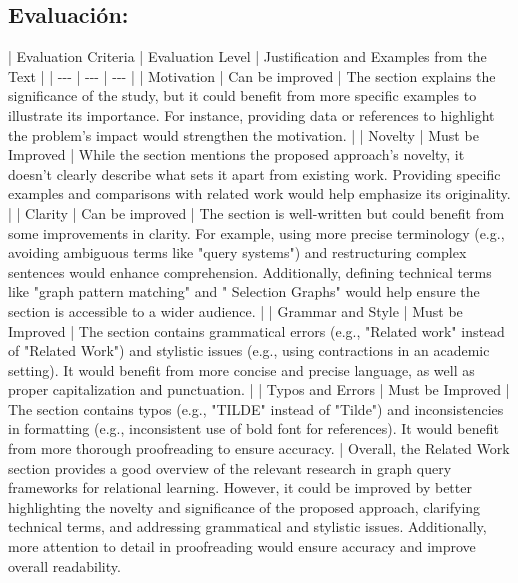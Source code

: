 \documentclass{article}%
\begin{document}
\subsection{Evaluación:}%
\label{subsec:Evaluacin}%
\newline%
| Evaluation Criteria | Evaluation Level | Justification and Examples from the Text |\newline%
| {-}{-}{-} | {-}{-}{-} | {-}{-}{-} |\newline%
| Motivation | Can be improved | The section explains the significance of the study, but it could benefit from more specific examples to illustrate its importance. For instance, providing data or references to highlight the problem's impact would strengthen the motivation. |\newline%
| Novelty | Must be Improved | While the section mentions the proposed approach's novelty, it doesn't clearly describe what sets it apart from existing work. Providing specific examples and comparisons with related work would help emphasize its originality. |\newline%
| Clarity | Can be improved | The section is well{-}written but could benefit from some improvements in clarity. For example, using more precise terminology (e.g., avoiding ambiguous terms like "query systems") and restructuring complex sentences would enhance comprehension. Additionally, defining technical terms like "graph pattern matching" and " Selection Graphs" would help ensure the section is accessible to a wider audience. |\newline%
| Grammar and Style | Must be Improved | The section contains grammatical errors (e.g., "Related work" instead of "Related Work") and stylistic issues (e.g., using contractions in an academic setting). It would benefit from more concise and precise language, as well as proper capitalization and punctuation. |\newline%
| Typos and Errors | Must be Improved | The section contains typos (e.g., "TILDE" instead of "Tilde") and inconsistencies in formatting (e.g., inconsistent use of bold font for references). It would benefit from more thorough proofreading to ensure accuracy. |\newline%
\newline%
Overall, the Related Work section provides a good overview of the relevant research in graph query frameworks for relational learning. However, it could be improved by better highlighting the novelty and significance of the proposed approach, clarifying technical terms, and addressing grammatical and stylistic issues. Additionally, more attention to detail in proofreading would ensure accuracy and improve overall readability.
\end{document}
